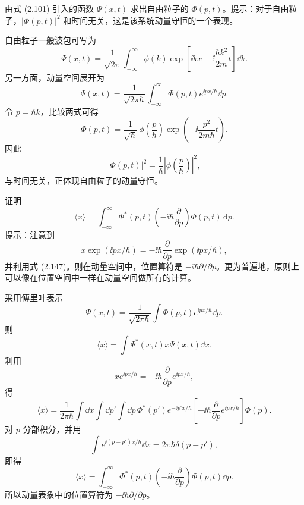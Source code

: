 \begin{question}
由式 (2.101) 引入的函数 $\Psi(x,t)$ 求出自由粒子的 $\Phi(p,t)$。提示：对于自由粒子，$|\Phi(p,t)|^2$ 和时间无关，这是该系统动量守恒的一个表现。

\par\smallskip
{}

\end{question}
\begin{solution}
自由粒子一般波包可写为
\[
\Psi(x,t)=\frac1{\sqrt{2\pi}}\int_{-\infty}^{\infty}
\phi(k)\exp\left[\ii kx-\ii\frac{\hbar k^2}{2m}t\right]\dd k.
\]
另一方面，动量空间展开为
\[
\Psi(x,t)=\frac1{\sqrt{2\pi\hbar}}\int_{-\infty}^{\infty}
\Phi(p,t)e^{\ii px/\hbar}\dd p.
\]
令 $p=\hbar k$，比较两式可得
\[
\boxed{\Phi(p,t)=\frac1{\sqrt\hbar}\,\phi\left(\frac p\hbar\right)
\exp\left(-\ii\frac{p^2}{2m\hbar}t\right).}
\]
因此
\[
|\Phi(p,t)|^2=\frac1\hbar\left|\phi\left(\frac p\hbar\right)\right|^2,
\]
与时间无关，正体现自由粒子的动量守恒。
\end{solution}

\begin{question}
证明
\[
\langle x\rangle=\int_{-\infty}^{\infty}\Phi^*(p,t)\left(-\ii\hbar\frac{\partial}{\partial p}\right)\Phi(p,t)\,\mathrm dp .
\tag{3.57}
\]
提示：注意到
\[
x\exp(\ii px/\hbar)=-\ii\hbar\frac{\partial}{\partial p}\exp(\ii px/\hbar),
\]
并利用式 (2.147)。则在动量空间中，位置算符是 $-\ii\hbar\partial/\partial p$。更为普遍地，原则上可以像在位置空间中一样在动量空间做所有的计算。

\par\smallskip
{}

\end{question}
\begin{solution}
采用傅里叶表示
\[
\Psi(x,t)=\frac1{\sqrt{2\pi\hbar}}\int \Phi(p,t)e^{\ii px/\hbar}\dd p.
\]
则
\[
\langle x\rangle=\int \Psi^*(x,t)x\Psi(x,t)\dd x.
\]
利用
\[
x e^{\ii px/\hbar}=-\ii\hbar\frac{\partial}{\partial p}e^{\ii px/\hbar},
\]
得
\[
\langle x\rangle
=\frac1{2\pi\hbar}\int\dd x\int\dd p'\int\dd p\,
\Phi^*(p')e^{-\ii p'x/\hbar}\left[-\ii\hbar\frac{\partial}{\partial p}e^{\ii px/\hbar}\right]\Phi(p).
\]
对 $p$ 分部积分，并用
\[
\int e^{\ii(p-p')x/\hbar}\dd x=2\pi\hbar\delta(p-p'),
\]
即得
\[
\boxed{\langle x\rangle=\int_{-\infty}^{\infty}\Phi^*(p,t)
\left(-\ii\hbar\frac{\partial}{\partial p}\right)\Phi(p,t)\dd p.}
\]
所以动量表象中的位置算符为 $-\ii\hbar\partial/\partial p$。
\end{solution}

